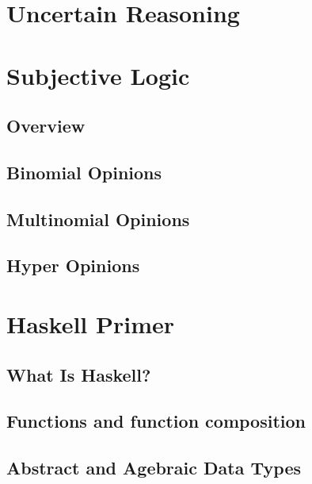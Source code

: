 \documentclass[a4paper]{report}
\begin{document}
\section{Uncertain Reasoning}








\section{Subjective Logic}

\subsection{Overview}

\subsection{Binomial Opinions}

\subsection{Multinomial Opinions}

\subsection{Hyper Opinions}










\section{Haskell Primer}

\subsection{What Is Haskell?}

\subsection{Functions and function composition}

\subsection{Abstract and Agebraic Data Types}
\end{document}
